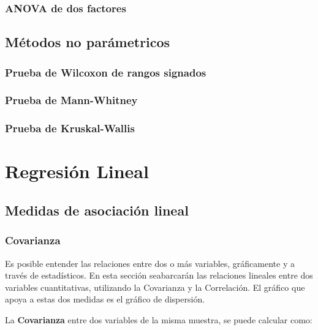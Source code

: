 \documentclass[
  11pt,
]{book}
\theoremstyle{definition}
\theoremstyle{definition}
\theoremstyle{definition}
\theoremstyle{definition}
\theoremstyle{remark}
\begin{document}
\subsection{ANOVA de dos factores}\label{anova-de-dos-factores}

\section{Métodos no parámetricos}\label{muxe9todos-no-paruxe1metricos}

\subsection{Prueba de Wilcoxon de rangos signados}\label{prueba-de-wilcoxon-de-rangos-signados}

\subsection{Prueba de Mann-Whitney}\label{prueba-de-mann-whitney}

\subsection{Prueba de Kruskal-Wallis}\label{prueba-de-kruskal-wallis}

\chapter{Regresión Lineal}\label{regresion-lineal}

\section{Medidas de asociación lineal}\label{regresion-lineal-medidas-asociacion}

\subsection{Covarianza}\label{regresion-lineal-covarianza}

Es posible entender las relaciones entre dos o más variables, gráficamente y a través de estadísticos. En esta sección seabarcarán las relaciones lineales entre dos variables cuantitativas, utilizando la Covarianza y la Correlación. El gráfico que apoya a estas dos medidas es el gráfico de dispersión.

La \textbf{Covarianza} entre dos variables de la misma muestra, se puede calcular como:
\end{document}
